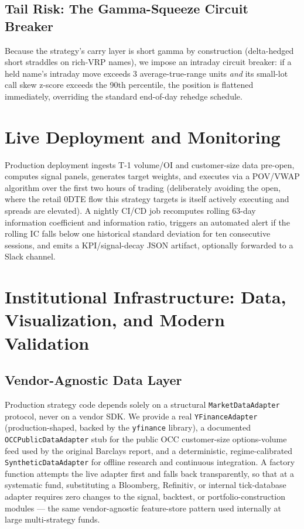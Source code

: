 \documentclass[11pt]{report}
\begin{document}
\section{Tail Risk: The Gamma-Squeeze Circuit Breaker}
Because the strategy's carry layer is short gamma by construction (delta-hedged short
straddles on rich-VRP names), we impose an intraday circuit breaker: if a held name's
intraday move exceeds 3 average-true-range units \emph{and} its small-lot call skew
z-score exceeds the 90th percentile, the position is flattened immediately, overriding
the standard end-of-day rehedge schedule.

\chapter{Live Deployment and Monitoring}

Production deployment ingests T-1 volume/OI and customer-size data pre-open, computes
signal panels, generates target weights, and executes via a POV/VWAP algorithm over the
first two hours of trading (deliberately avoiding the open, where the retail 0DTE flow
this strategy targets is itself actively executing and spreads are elevated). A nightly
CI/CD job recomputes rolling 63-day information coefficient and information ratio,
triggers an automated alert if the rolling IC falls below one historical standard
deviation for ten consecutive sessions, and emits a KPI/signal-decay JSON artifact,
optionally forwarded to a Slack channel.

\chapter{Institutional Infrastructure: Data, Visualization, and Modern Validation}

\section{Vendor-Agnostic Data Layer}
Production strategy code depends solely on a structural \texttt{MarketDataAdapter} protocol,
never on a vendor SDK. We provide a real \texttt{YFinanceAdapter} (production-shaped, backed by
the \texttt{yfinance} library), a documented \texttt{OCCPublicDataAdapter} stub for the public
OCC customer-size options-volume feed used by the original Barclays report, and a deterministic,
regime-calibrated \texttt{SyntheticDataAdapter} for offline research and continuous integration.
A factory function attempts the live adapter first and falls back transparently, so that at a
systematic fund, substituting a Bloomberg, Refinitiv, or internal tick-database adapter requires
zero changes to the signal, backtest, or portfolio-construction modules --- the same
vendor-agnostic feature-store pattern used internally at large multi-strategy funds.
\end{document}
